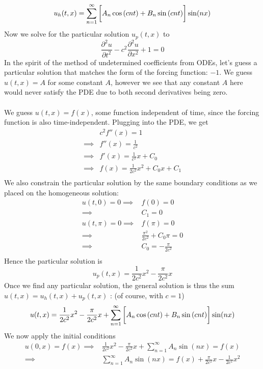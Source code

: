 \documentclass[12pt]{article}
\begin{document}
{$$u_h(t,x) = \sum_{n=1}^{\infty} \left[  \vphantom{\frac{1}{1}} A_n \cos \left( cnt \right) + B_n \sin \left( cnt \right) \right] \sin(nx)$$
Now we solve for the particular solution $u_p(t,x)$ to 
$$\frac{\partial^2 u}{\partial t^2} - c^2 \frac{\partial^2 u}{\partial x^2} + 1 = 0$$
In the spirit of the method of undetermined coefficients from ODEs, let's guess a particular solution that matches the form of the forcing function: $-1$. We guess $u(t,x) = A$ for some constant $A$, however we see that any constant $A$ here would never satisfy the PDE due to both second derivatives being zero. \\ \\ We guess $u(t,x) = f(x)$, some function independent of time, since the forcing function is also time-independent. Plugging into the PDE, we get
\begin{align*}
& c^2f''(x) = 1 \\
\implies& f''(x) = \frac{1}{c^2} \\
\implies& f'(x) = \frac{1}{c^2} x + C_0 \\
\implies& f(x) = \frac{1}{2c^2} x^2 + C_0 x + C_1 \\
\end{align*}
We also constrain the particular solution by the same boundary conditions as we placed on the homogeneous solution:
\begin{align*}
u(t,0) = 0 \implies& f(0) = 0 \\
\implies& \boxed{C_1 = 0} \\
u(t,\pi) = 0 \implies& f(\pi) = 0 \\
\implies& \frac{\pi^2}{2c^2} + C_0 \pi = 0 \\
\implies& C_0 = -\frac{\pi}{2c^2} \\
\end{align*}
Hence the particular solution is 
$$u_p(t,x) = \frac{1}{2c^2} x^2 - \frac{\pi}{2c^2} x$$
Once we find any particular solution, the general solution is thus the sum $u(t,x) = u_h(t,x) + u_p(t,x)$ : (of course, with $c=1$) 
$$u(t,x) = \frac{1}{2c^2} x^2 - \frac{\pi}{2c^2} x + \sum_{n=1}^{\infty} \left[  \vphantom{\frac{1}{1}} A_n \cos \left( cnt \right) + B_n \sin \left( cnt \right) \right] \sin(nx)$$
We now apply the initial conditions \\
\begin{align*}
u(0,x) = f(x) \implies&  \frac{1}{2c^2} x^2 - \frac{\pi}{2c^2} x + \sum_{n=1}^{\infty} A_n \sin(nx) = f(x)\\
\implies& \sum_{n=1}^{\infty} A_n \sin(nx) = f(x) + \frac{\pi}{2c^2} x - \frac{1}{2c^2} x^2 \\

\end{align*}}
\end{document}
